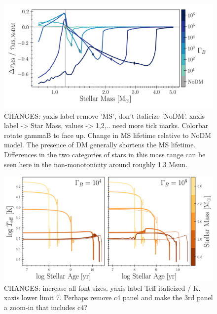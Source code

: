 \documentclass[useAMS,usenatbib]{mnras}
\begin{document}
  \begin{figure}
    \centering
    \includegraphics[width=\textwidth]{plots/mstau.png}
    \caption{CHANGES: yaxis label remove 'MS', don't italicize 'NoDM'. xaxis label -> Star Mass, values -> 1,2,.. need more tick marks. Colorbar rotate gammaB to face up.
    Change in MS lifetime relative to NoDM model. The presence of DM generally shortens the MS lifetime.
    Differences in the two categories of stars in this mass range can be seen here in the non-monotonicity around roughly 1.3 Msun.
    }
    \label{fig:mstau}
  \end{figure}

  \begin{figure}
    \centering
    \includegraphics[width=\textwidth]{plots/Teff.png}
    \caption{CHANGES: increase all font sizes. yaxis label Teff italicized / K. xaxis lower limit 7. Perhaps remove c4 panel and make the 3rd panel a zoom-in that includes c4?}
    \label{fig:Teff}
  \end{figure}
\end{document}

